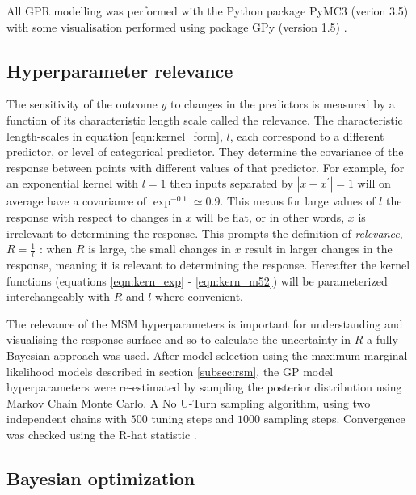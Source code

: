 All GPR modelling was performed with the Python package PyMC3 (verion 3.5) \cite{salvatierProbabilisticProgrammingPython2016} with some visualisation performed using package GPy (version 1.5) \cite{gpy2014}. 

\subsection{Hyperparameter relevance}\label{sub:msm_meth_rel}

The sensitivity of the outcome $y$ to changes in the predictors is measured by a function of its characteristic length scale called the relevance. The characteristic length-scales in equation \ref{eqn:kernel_form}, $l$, each correspond to a different predictor, or level of categorical predictor. They determine the covariance of the response between points with different values of that predictor. For example, for an exponential kernel with $l=1$ then inputs separated by $|x-x^{\prime}|= 1$ will on average have a covariance of $\exp^{-0.1}\simeq 0.9$. This means for large values of $l$ the response with respect to changes in $x$ will be flat, or in other words, $x$ is irrelevant to determining the response. This prompts the definition of \emph{relevance}, $R = \frac{1}{l}$ \cite{bernardo1998regression,bergstrajamesbergstraRandomSearchHyperParameter2012}: when $R$ is large, the small changes in $x$ result in larger changes in the response, meaning it is relevant to determining the response. Hereafter the kernel functions (equations \ref{eqn:kern_exp} - \ref{eqn:kern_m52}) will be parameterized interchangeably with $R$ and $l$ where convenient.  

The relevance of the MSM hyperparameters is important for understanding and visualising the response surface and so to calculate the uncertainty in $R$ a fully Bayesian approach was used. After model selection using the maximum marginal likelihood models described in section \ref{subsec:rsm}, the GP model hyperparameters were re-estimated by sampling the posterior distribution using Markov Chain Monte Carlo. A No U-Turn sampling algorithm, using two independent chains with $500$ tuning steps and $1000$ sampling steps. Convergence was checked using the R-hat statistic \cite{vehtariRanknormalizationFoldingLocalization2020}. 

\subsection{Bayesian optimization}\label{subsec:bayes_opt}

